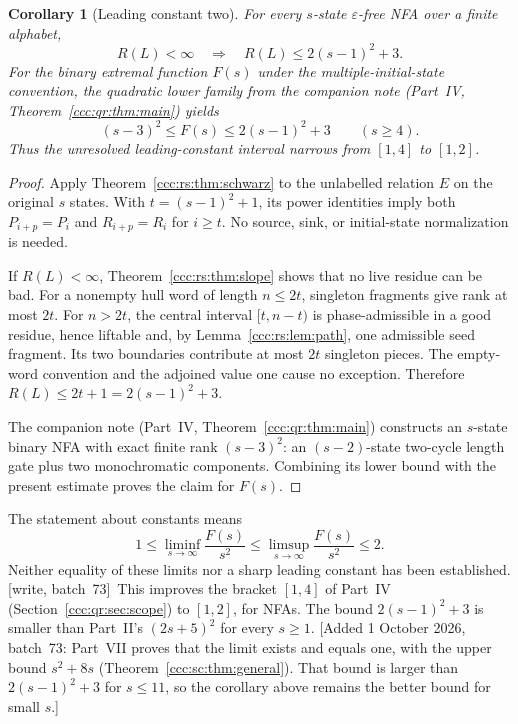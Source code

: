 \documentclass[11pt,letterpaper]{article}
\newtheorem{corollary}[theorem]{Corollary}
\theoremstyle{definition}
\theoremstyle{remark}
\newcommand{\eps}{\varepsilon}
\newcommand{\wsevthree}{\textup{[write, batch~73]}}
\newcommand{\waddsevthree}[1]{\textup{[}Added 1 October 2026, batch~73: #1\textup{]}}
\begin{document}
\begin{corollary}[Leading constant two]\label{ccc:rs:cor:upper}
For every $s$-state $\eps$-free NFA over a finite alphabet,
\[
R(L)<\infty\quad\Longrightarrow\quad R(L)\le2(s-1)^2+3.
\]
For the binary extremal function $F(s)$ under the multiple-initial-state convention, the quadratic lower family from the companion note (Part~IV, Theorem~\ref{ccc:qr:thm:main}) yields
\[
(s-3)^2\le F(s)\le2(s-1)^2+3\qquad(s\ge4).
\]
Thus the unresolved leading-constant interval narrows from $[1,4]$ to $[1,2]$.
\end{corollary}
\begin{proof}
Apply Theorem~\ref{ccc:rs:thm:schwarz} to the unlabelled relation $E$ on the original $s$ states. With $t=(s-1)^2+1$, its power identities imply both $P_{i+p}=P_i$ and $R_{i+p}=R_i$ for $i\ge t$. No source, sink, or initial-state normalization is needed.

If $R(L)<\infty$, Theorem~\ref{ccc:rs:thm:slope} shows that no live residue can be bad. For a nonempty hull word of length $n\le2t$, singleton fragments give rank at most $2t$. For $n>2t$, the central interval $[t,n-t)$ is phase-admissible in a good residue, hence liftable and, by Lemma~\ref{ccc:rs:lem:path}, one admissible seed fragment. Its two boundaries contribute at most $2t$ singleton pieces. The empty-word convention and the adjoined value one cause no exception. Therefore $R(L)\le2t+1=2(s-1)^2+3$.

The companion note (Part~IV, Theorem~\ref{ccc:qr:thm:main}) constructs an $s$-state binary NFA with exact finite rank $(s-3)^2$: an $(s-2)$-state two-cycle length gate plus two monochromatic components. Combining its lower bound with the present estimate proves the claim for $F(s)$.
\end{proof}

The statement about constants means
\[
1\le\liminf_{s\to\infty}\frac{F(s)}{s^2}
\le\limsup_{s\to\infty}\frac{F(s)}{s^2}\le2.
\]
Neither equality of these limits nor a sharp leading constant has been established.
\wsevthree\ This improves the bracket $[1,4]$ of Part~IV
(Section~\ref{ccc:qr:sec:scope}) to $[1,2]$, for NFAs. The bound
$2(s-1)^2+3$ is smaller than Part~II's $(2s+5)^2$ for every $s\ge1$.
\waddsevthree{Part~VII proves that the limit exists and equals one, with the
upper bound $s^2+8s$ (Theorem~\ref{ccc:sc:thm:general}). That bound is
larger than $2(s-1)^2+3$ for $s\le11$, so the corollary above remains the
better bound for small $s$.}
\end{document}
